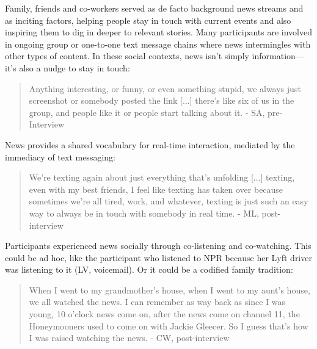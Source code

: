\documentclass[sigchi]{acmart}
\begin{document}
Family, friends and co-workers served as de facto background news streams and as inciting factors, helping people stay in touch with current events and also inspiring them to dig in deeper to relevant stories. Many participants are involved in ongoing group or one-to-one text message chains where news intermingles with other types of content. In these social contexts, news isn’t simply information—it’s also a nudge to stay in touch:
\begin{quote}
Anything interesting, or funny, or even something stupid, we always just screenshot or somebody posted the link [...] there's like six of us in the group, and people like it or people start talking about it. - SA, pre-Interview
\end{quote}
News provides a shared vocabulary for real-time interaction, mediated by the immediacy of text messaging:
\begin{quote}
We're texting again about just everything that's unfolding [...] texting, even with my best friends, I feel like texting has taken over because sometimes we're all tired, work, and whatever, texting is just such an easy way to always be in touch with somebody in real time. - ML, post-interview
\end{quote}
Participants experienced news socially through co-listening and co-watching. This could be ad hoc, like the participant who listened to NPR because her Lyft driver was listening to it (LV, voicemail). Or it could be a codified family tradition:
\begin{quote}
  When I went to my grandmother's house, when I went to my aunt's house, we all watched the news. I can remember as way back as since I was young, 10 o’clock news come on, after the news come on channel 11, the Honeymooners used to come on with Jackie Gleecer. So I guess that's how I was raised watching the news. - CW, post-interview 
\end{quote}
\end{document}
